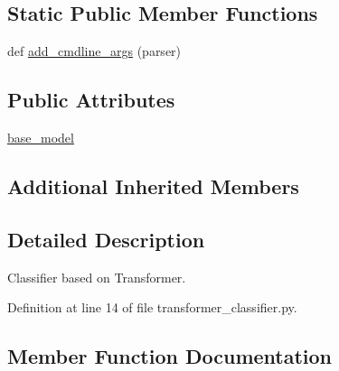 \subsection*{Static Public Member Functions}
\begin{DoxyCompactItemize}
\item 
def \hyperlink{classparlai_1_1agents_1_1transformer__classifier_1_1transformer__classifier_1_1TransformerClassifierAgent_aedef4e7b90acc77302db619b742f7ab4}{add\+\_\+cmdline\+\_\+args} (parser)
\end{DoxyCompactItemize}
\subsection*{Public Attributes}
\begin{DoxyCompactItemize}
\item 
\hyperlink{classparlai_1_1agents_1_1transformer__classifier_1_1transformer__classifier_1_1TransformerClassifierAgent_a9893f246ed245dd63751b31e1ce9b8ef}{base\+\_\+model}
\end{DoxyCompactItemize}
\subsection*{Additional Inherited Members}


\subsection{Detailed Description}
\begin{DoxyVerb}Classifier based on Transformer.
\end{DoxyVerb}
 

Definition at line 14 of file transformer\+\_\+classifier.\+py.



\subsection{Member Function Documentation}
\mbox{\label{classparlai_1_1agents_1_1transformer__classifier_1_1transformer__classifier_1_1TransformerClassifierAgent_aedef4e7b90acc77302db619b742f7ab4}} 
